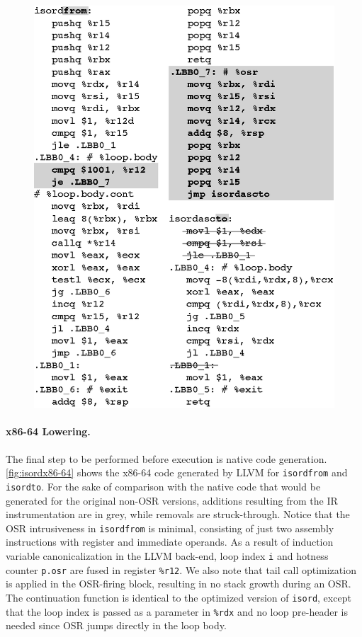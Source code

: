 \ifdefined\noauthorea
\begin{figure}[t]
\begin{center}
\includegraphics[width=0.9\columnwidth]{figures/isordx86-64/isordx86-64.eps}
\caption{\protect}
\end{center}
\end{figure}
\fi

\paragraph{x86-64 Lowering.}
The final step to be performed before execution is native code generation. \myfigure\ref{fig:isordx86-64} shows the x86-64 code generated by LLVM for {\tt isordfrom} and {\tt isordto}. For the sake of comparison with the native code that would be generated for the original non-OSR versions, additions resulting from the IR instrumentation are in grey, while removals are struck-through. Notice that the OSR intrusiveness in {\tt isordfrom} is minimal, consisting of just two assembly instructions with register and immediate operands. As a result of induction variable canonicalization in the LLVM back-end, loop index {\tt i} and hotness counter {\tt p.osr} are fused in register {\tt\%r12}. We also note that tail call optimization is applied in the OSR-firing block, resulting in no stack growth during an OSR. The continuation function is identical to the optimized version of {\tt isord}, except that the loop index is passed as a parameter in {\tt \%rdx} and no loop pre-header is needed since OSR jumps directly in the loop body.

